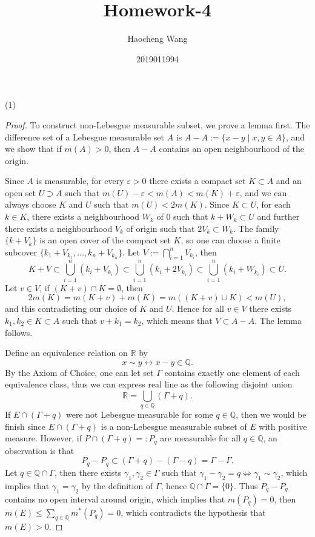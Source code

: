 \documentclass[a4paper]{article}
\title{Homework-4}
\author{Haocheng Wang \and 2019011994}
\begin{document}
\maketitle
(1)\begin{proof}
To construct non-Lebesgue measurable subset, we prove a lemma first. The difference set of a Lebesgue 
measurable set $A$ is $A - A := \{x - y \mid x, y \in A\}$,
and we show that if $m(A) > 0$, then $A - A$ contains an open neighbourhood of the origin.

Since $A$ is measurable, for every $\varepsilon > 0$ there exists a compact set $K \subset A$ and an open set 
$U \supset A$ such that $m(U) - \varepsilon < m(A) < m(K) + \varepsilon$, and we can always choose $K$ and $U$
such that $m(U) < 2m(K)$. Since $K \subset U$, for each $k \in K$, there exists a neighbourhood $W_k$ of 0 such
that $k + W_k \subset U$ and further there exists a neighbourhood $V_k$ of origin such that $2V_k \subset W_k$.
The family $\{k + V_k\}$ is an open cover of the compact set $K$, so one can choose a finite subcover 
$\{k_1 + V_{k_1}, \dots, k_n + V_{k_n}\}$. Let $V := \bigcap_{i = 1}^n V_{k_i}$, then$$
K + V \subset \bigcup_{i = 1}^n (k_i + V_{k_i}) \subset \bigcup_{i = 1}^n (k_i + 2V_{k_i}) \subset 
\bigcup_{i = 1}^n (k_i + W_{k_i}) \subset U.
$$Let $v \in V$, if $(K + v) \cap K = \emptyset$, then $$
2m(K) = m(K + v) + m(K) = m((K + v) \cup K) < m(U),
$$and this contradicting our choice of $K$ and $U$. Hence for all $v \in V$ there exists $k_1, k_2 \in K \subset A$
such that $v + k_1 = k_2$, which means that $V \subset A - A$. The lemma follows.

Define an equivalence relation on $\mathbb{R}$ by$$
x \sim y \leftrightarrow x - y \in \mathbb{Q}.
$$By the Axiom of Choice, one can let set $\Gamma$ contains exactly one element of each equivalence class, thus we 
can express real line as the following disjoint union $$
\mathbb{R} = \bigcup_{q \in \mathbb{Q}} (\Gamma + q).
$$If $E \cap (\Gamma + q)$ were not Lebesgue measurable for some $q \in \mathbb{Q}$, then we would be finish since
$E \cap (\Gamma + q)$ is a non-Lebesgue measurable subset of $E$ with positive measure. However, if 
$P \cap (\Gamma + q) =: P_q$ are measurable for all $q \in \mathbb{Q}$, an observation is that$$
P_q - P_q \subset (\Gamma + q) - (\Gamma - q) = \Gamma - \Gamma.
$$Let $q \in \mathbb{Q} \cap \Gamma$, then there exists $\gamma_1, \gamma_2 \in \Gamma$ such that 
$\gamma_1 - \gamma_2 = q \Leftrightarrow \gamma_1 \sim \gamma_2$, which implies that $\gamma_1 = \gamma_2$ by the 
definition of $\Gamma$, hence $\mathbb{Q} \cap \Gamma = \{0\}$. Thus $P_q - P_q$ contains no open interval around
origin, which implies that $m(P_q) = 0$, then $m(E) \leq \sum_{q \in \mathbb{Q}} m^*(P_q) = 0$, 
which contradicts the hypothesis that $m(E) > 0$.
\end{proof}
\end{document}
